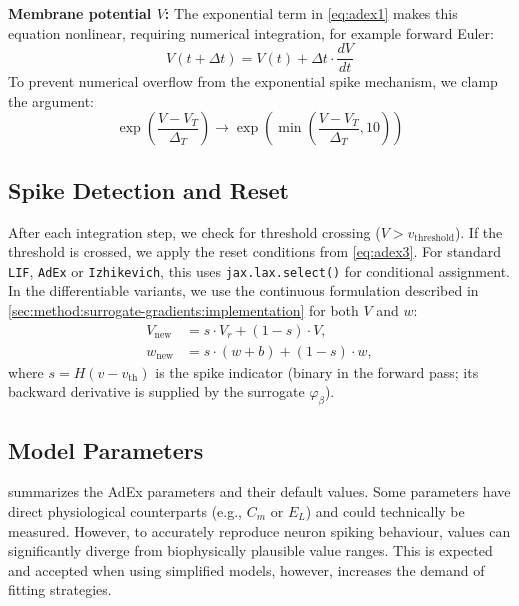 \textbf{Membrane potential $V$:}
The exponential term in \cref{eq:adex1} makes this equation nonlinear, requiring numerical integration, for example forward Euler:
\begin{equation}
    V(t + \Delta t) = V(t) + \Delta t \cdot \frac{dV}{dt}
\end{equation}
To prevent numerical overflow from the exponential spike mechanism, we clamp the argument:
\begin{equation}
    \exp\left(\frac{V - V_T}{\Delta_T}\right) \rightarrow \exp\left(\min\left(\frac{V - V_T}{\Delta_T}, 10\right)\right)
\end{equation}

\subsection{Spike Detection and Reset}\label{sec:method:adex:spike-detection}
After each integration step, we check for threshold crossing ($V > v_{\text{threshold}}$).
If the threshold is crossed, we apply the reset conditions from \cref{eq:adex3}.
For standard \texttt{LIF}, \texttt{AdEx} or \texttt{Izhikevich}, this uses \texttt{jax.lax.select()} for conditional assignment.
In the differentiable variants, we use the continuous formulation described in \cref{sec:method:surrogate-gradients:implementation} for both $V$ and $w$:
\begin{align}
    V_{\text{new}} &= s \cdot V_r + (1 - s) \cdot V, \\
    w_{\text{new}} &= s \cdot (w + b) + (1 - s) \cdot w,
\end{align}
where $s = H(v - v_{\text{th}})$ is the spike indicator (binary in the forward pass; its backward derivative is supplied by the surrogate $\varphi_\beta$).

\subsection{Model Parameters}\label{sec:method:adex:default-parameters}
 summarizes the \gls{AdEx} parameters and their default values.
Some parameters have direct physiological counterparts (e.g., $C_m$ or $E_L$) and could technically be measured.
However, to accurately reproduce neuron spiking behaviour, values can significantly diverge from biophysically plausible value ranges.
This is expected and accepted when using simplified models, however, increases the demand of fitting strategies.


